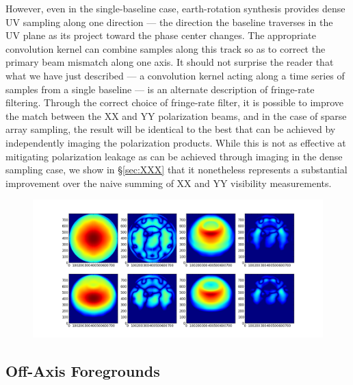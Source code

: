 \documentclass[twocolumn,apj,numberedappendix]{emulateapj}
\begin{document}
However, even in the single-baseline case, earth-rotation synthesis provides dense UV sampling along one direction --- the
direction the baseline traverses in the UV plane as its project toward the phase center changes.  The appropriate
convolution kernel can combine samples along this track so as to correct the primary beam mismatch along one axis.
It should not surprise the reader that what we have just described --- a convolution kernel acting along a time series
of samples from a single baseline --- is an alternate description of fringe-rate filtering.  Through the correct
choice of fringe-rate filter, it is possible to improve the match between the XX and YY polarization beams, and
in the case of sparse array sampling, the result will be identical to the best that can be achieved by independently
imaging the polarization products.  While this is not as effective at mitigating polarization leakage as can be achieved
through imaging in the dense sampling case, we show in \S\ref{sec:XXX} that it nonetheless represents a substantial improvement
over the naive summing of XX and YY visibility measurements.


\begin{figure}\centering
\includegraphics[width=.9\columnwidth]{plots/fringe_beam_wgts.png}
\caption{
}\label{fig:fringe_beam_wgts}
\end{figure}

\subsection{Off-Axis Foregrounds}
\label{sec:foregrounds}
\end{document}
